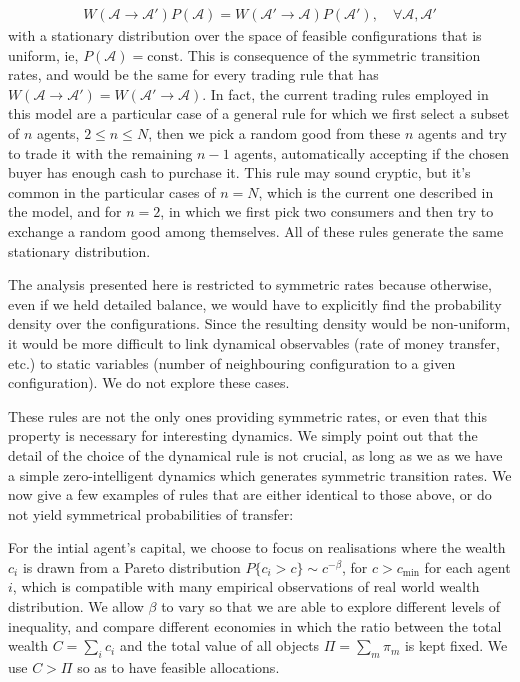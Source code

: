 \begin{align}
W(\mathcal{A} \to \mathcal{A}') P(\mathcal{A}) = W(\mathcal{A}'\to \mathcal{A})P(\mathcal{A}'),  \quad \forall \mathcal{A}, \mathcal{A}'
\end{align}
with a stationary distribution over the space of feasible configurations that is uniform, ie, $P(\mathcal{A})= \text{const}$. This is consequence of the symmetric transition rates, and would be the same for every trading rule that has $W(\mathcal{A}\to \mathcal{A}')=W(\mathcal{A}'\to \mathcal{A})$. In fact, the current trading rules employed in this model are a particular case of a general rule for which we first select a subset of $n$ agents, $2 \leq n \leq N$, then we pick a random good from these $n$ agents and try to trade it with the remaining $n-1$ agents, automatically accepting if the chosen buyer has enough cash to purchase it. This rule may sound cryptic, but it's common in the particular cases of $n=N$, which is the current one described in the model, and for $n=2$, in which we first pick two consumers and then try to exchange a random good among themselves. All of these rules generate the same stationary distribution.

The analysis presented here is restricted to symmetric rates because otherwise, even if we held detailed balance, we would have to explicitly find the probability density over the configurations. Since the resulting density would be non-uniform, it would be more difficult to link dynamical observables (rate of money transfer, etc.) to static variables (number of neighbouring configuration to a given configuration). We do not explore these cases.

These rules are not the only ones providing symmetric rates, or even that this property is necessary for interesting dynamics. We simply point out that the detail of the choice of the dynamical rule is not crucial, as long as we as we have a simple zero-intelligent dynamics which generates symmetric transition rates. We now give a few examples of rules that are either identical to those above, or do not yield symmetrical probabilities of transfer:


For the intial agent's capital, we choose to focus on realisations where the wealth $c_i$ is drawn from a Pareto distribution $P\{c_i> c\} \sim c^{-\beta}$, for $c>c_{\min}$ for each agent $i$, which is compatible with many empirical observations of real world wealth distribution. We allow $\beta$ to vary so that we are able to explore different levels of inequality, and compare different economies in which the ratio between the total wealth $C=\sum_i c_i$ and the total value of all objects $\Pi=\sum_{m}\pi_m$ is kept fixed. We use $C>\Pi$ so as to have feasible allocations.

